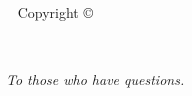 

{
\let\allcaps=\relax
\maketitle %
}


\newpage
\begin{fullwidth}
	~\vfill
	\thispagestyle{empty}
	\setlength{\parindent}{0pt}
	\setlength{\parskip}{\baselineskip}
	Copyright \copyright\ \the\year\ \thanklessauthor
	
	
	
\end{fullwidth}

\tableofcontents %




\clearpage
~\vfill
\begin{doublespace}
	\noindent\fontsize{18}{22}\selectfont\itshape
	\nohyphenation
	To those who have questions.
\end{doublespace}
\vfill
\vfill
